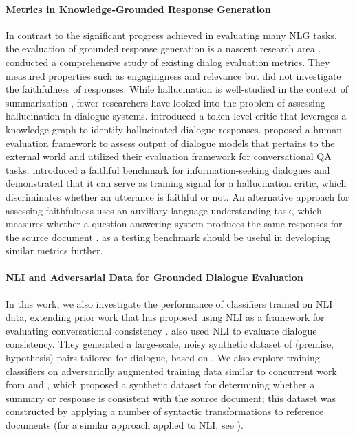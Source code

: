 \paragraph{Metrics in Knowledge-Grounded Response Generation}
In contrast to the significant progress achieved in evaluating many NLG tasks, the evaluation of grounded response generation is a nascent research area \cite{shuster-etal-2021-retrieval-augmentation, rashkin2021measuring, dziri-etal-2021-neural}.  \citet{yeh-etal-2021-comprehensive} conducted a comprehensive study of existing dialog evaluation metrics. They measured properties such as engagingness and relevance but did not investigate the faithfulness of responses. While hallucination is well-studied in the context of summarization \cite{durmus-etal-2020-feqa,maynez2020faithfulness,nan-etal-2021,falke-etal-2019-ranking}, fewer researchers have looked into the problem of assessing hallucination in dialogue systems. 
\citet{dziri-etal-2021-neural} introduced a token-level critic that leverages a knowledge graph to identify hallucinated dialogue responses. 
\citet{rashkin2021measuring} proposed a human evaluation framework to assess output of dialogue models that pertains to the external world and utilized their evaluation framework for conversational QA tasks. \citet{dziri2022faithdial} introduced a faithful benchmark for information-seeking dialogues and demonstrated that it can serve as training signal for a hallucination critic, which discriminates whether an utterance is faithful or not.
An alternative approach for assessing faithfulness uses an auxiliary language understanding task, which measures whether a question answering system produces the same responses for the source document \cite{honovich-etal-2021-q2}. \BEGIN{} as a testing benchmark should be useful in developing similar metrics further.

 \paragraph{NLI and Adversarial Data for Grounded Dialogue Evaluation}
 In this work, we also investigate the performance of classifiers trained on NLI data, extending prior work that has proposed using NLI as a framework for evaluating conversational consistency \cite{welleck2018dialogue}. 
  also used NLI to evaluate dialogue consistency. They generated a large-scale, noisy synthetic dataset of (premise, hypothesis) pairs tailored for dialogue, based on .  
 We also explore training classifiers on adversarially augmented training data similar to concurrent work from   and , which  proposed a synthetic dataset for determining whether a summary or response is consistent with the source document; this dataset was constructed by applying a number of syntactic transformations to reference documents (for a similar approach applied to NLI, see \citealt{min-etal-2020-syntactic}).













